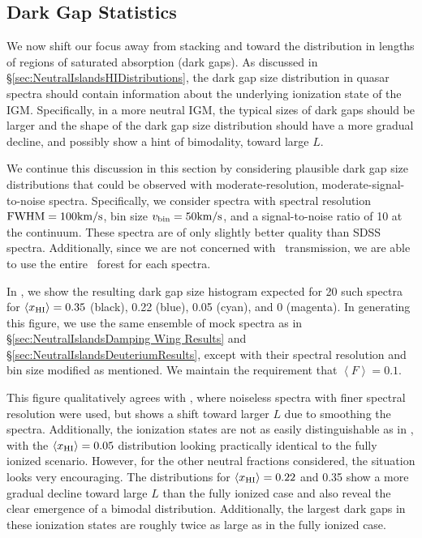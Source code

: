 \subsection{Dark Gap Statistics} \label{sec:NeutralIslandsDarkGaps}


We now shift our focus away from stacking and toward the distribution in lengths of regions of saturated absorption (dark gaps). As discussed in \S\ref{sec:NeutralIslandsHIDistributions}, the dark gap size distribution in quasar spectra should contain information about the underlying ionization state of the IGM. Specifically, in a more neutral IGM, the typical sizes of dark gaps should be larger and the shape of the dark gap size distribution should have a more gradual decline, and possibly show a hint of bimodality, toward large $L$. 


We continue this discussion in this section by considering plausible dark gap size distributions that could be observed with moderate-resolution, moderate-signal-to-noise spectra. Specifically, we consider spectra with spectral resolution $\text{FWHM} = 100\text{km}/\text{s}$, bin size $v_{\text{bin}} = 50\text{km}/\text{s}$, and a signal-to-noise ratio of 10 at the continuum. These spectra are of only slightly better quality than SDSS spectra. Additionally, since we are not concerned with \lyb\ transmission, we are able to use the entire \lya\ forest for each spectra.



In , we show the resulting dark gap size histogram expected for 20 such spectra for $\langle x_{\text{HI}}\rangle = 0.35$ (black), 0.22 (blue), 0.05 (cyan), and 0 (magenta). In generating this figure, we use the same ensemble of mock spectra as in \S\ref{sec:NeutralIslandsDamping Wing Results} and \S\ref{sec:NeutralIslandsDeuteriumResults}, except with their spectral resolution and bin size modified as mentioned. We maintain the requirement that $\left\langle F \right\rangle = 0.1$. 


This figure qualitatively agrees with , where noiseless spectra with finer spectral resolution were used, but shows a shift toward larger $L$ due to smoothing the spectra. Additionally, the ionization states are not as easily distinguishable as in , with the $\langle x_{\text{HI}}\rangle = 0.05$ distribution looking practically identical to the fully ionized scenario. However, for the other neutral fractions considered, the situation looks very encouraging. The distributions for $\langle x_{\text{HI}}\rangle = 0.22$ and 0.35 show a more gradual decline toward large $L$ than the fully ionized case and also reveal the clear emergence of a bimodal distribution. Additionally, the largest dark gaps in these ionization states are roughly twice as large as in the fully ionized case. 


